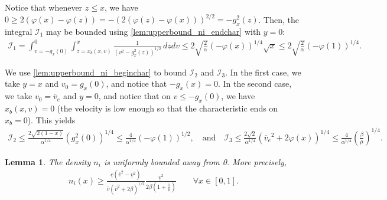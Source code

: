 \documentclass{article}
\newtheorem{lem}{Lemma}[section]
\numberwithin{equation}{section}
\newcommand{\ve}{{\overline{v}_e}} %
\newcommand{\DomUpL}{{\mathcal{D}_1}} %
\newcommand{\DomUpR}{{\mathcal{D}_2}} %
\newcommand{\DomLow}{{\mathcal{D}_3}} %
\newcommand{\IntUpL}{{\mathcal{I}_1}} %
\newcommand{\IntUpR}{{\mathcal{I}_2}} %
\newcommand{\IntLow}{{\mathcal{I}_3}} %
\newcommand{\domfel}{{\underline{v}}} %
\newcommand{\domfeu}{{\overline{v}}} %
\newcommand{\minfe}{{\underline{c}}} %
\begin{document}
{	Notice that whenever $z \leqslant x$, we have $0 \geqslant 2\left(\varphi(x) - \varphi(z)\right) = - \left(2\left(\varphi(z) - \varphi(x)\right)\right)^{2/2} = - g_x^2(z)$. Then, the integral $\IntUpL$ may be bounded using \cref{lem:upperbound_ni_endchar} with $y=0$:
	\begin{align*}
		\IntUpL = \int_{v=-g_x(0)}^{0} \int_{z=x_b(x,v)}^{x} \frac{1}{\left(v^2 - g_x^2(z)\right)^{1/2}} \, dz dv 
		\leqslant 2 \sqrt{\frac{2}{\alpha}} \left(-\varphi(x)\right)^{1/4} \sqrt{x}
		\leqslant 2 \sqrt{\frac{2}{\alpha}} \left(-\varphi(1)\right)^{1/4}.
	\end{align*}
	
	We use \cref{lem:upperbound_ni_beginchar} to bound $\IntUpR$ and $\IntLow$. In the first case, we take $y=x$ and $v_0 = g_x(0)$, and notice that $-g_x(x)=0$. In the second case, we take $v_0 = \ve$ and $y=0$, and notice that on $v \leqslant -g_x(0)$, we have $x_b(x,v) = 0$ (the velocity is low enough so that the characteristic ends on $x_b=0$). This yields
	\begin{align*}
		\IntUpR \leqslant \frac{2\sqrt{2(1-x)}}{\alpha^{1/4}} \left(g_x^2(0)\right)^{1/4} \leqslant \frac{4}{\alpha^{1/4}} \left(-\varphi(1)\right)^{1/2} , \quad\text{and}\quad
		\IntLow \leqslant \frac{2\sqrt{2}}{\alpha^{1/4}} \left(\ve^2 + 2 \varphi(x)\right)^{1/4} \leqslant \frac{4}{\alpha^{1/4}} \left(\frac{\beta}{\mu}\right)^{1/4}.
	\end{align*}
}

\begin{lem}
	The density $n_i$ is uniformly bounded away from 0. More precisely, 
	\begin{align*}
		n_i(x) \geqslant \frac{\minfe (\domfeu^2 - \domfel^2)}{\domfeu \left(\domfeu^2 + 2\beta\right)^{1/2}} \frac{\domfel^2}{2\beta\left(1+\frac{1}{\mu}\right)} \quad\quad\forall x\in[0,1].
	\end{align*}
\end{lem}
\end{document}
